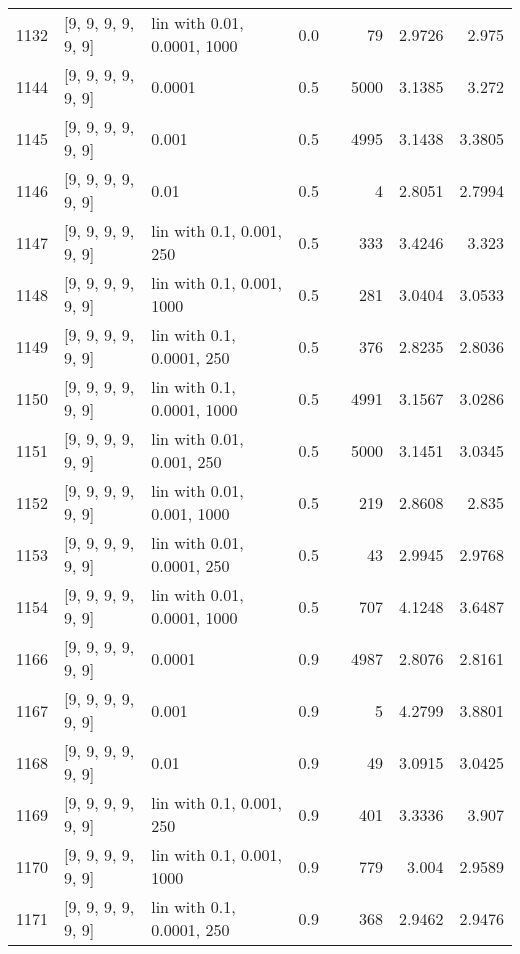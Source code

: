 \begin{longtable}{lllrrrrr}
 1132 & [9, 9, 9, 9, 9, 9] & lin with 0.01, 0.0001, 1000 &      0.0 &     &   79 &   2.9726 &    2.975 \\
 1144 & [9, 9, 9, 9, 9, 9] &                      0.0001 &      0.5 &     & 5000 &   3.1385 &    3.272 \\
 1145 & [9, 9, 9, 9, 9, 9] &                       0.001 &      0.5 &     & 4995 &   3.1438 &   3.3805 \\
 1146 & [9, 9, 9, 9, 9, 9] &                        0.01 &      0.5 &     &    4 &   2.8051 &   2.7994 \\
 1147 & [9, 9, 9, 9, 9, 9] &    lin with 0.1, 0.001, 250 &      0.5 &     &  333 &   3.4246 &    3.323 \\
 1148 & [9, 9, 9, 9, 9, 9] &   lin with 0.1, 0.001, 1000 &      0.5 &     &  281 &   3.0404 &   3.0533 \\
 1149 & [9, 9, 9, 9, 9, 9] &   lin with 0.1, 0.0001, 250 &      0.5 &     &  376 &   2.8235 &   2.8036 \\
 1150 & [9, 9, 9, 9, 9, 9] &  lin with 0.1, 0.0001, 1000 &      0.5 &     & 4991 &   3.1567 &   3.0286 \\
 1151 & [9, 9, 9, 9, 9, 9] &   lin with 0.01, 0.001, 250 &      0.5 &     & 5000 &   3.1451 &   3.0345 \\
 1152 & [9, 9, 9, 9, 9, 9] &  lin with 0.01, 0.001, 1000 &      0.5 &     &  219 &   2.8608 &    2.835 \\
 1153 & [9, 9, 9, 9, 9, 9] &  lin with 0.01, 0.0001, 250 &      0.5 &     &   43 &   2.9945 &   2.9768 \\
 1154 & [9, 9, 9, 9, 9, 9] & lin with 0.01, 0.0001, 1000 &      0.5 &     &  707 &   4.1248 &   3.6487 \\
 1166 & [9, 9, 9, 9, 9, 9] &                      0.0001 &      0.9 &     & 4987 &   2.8076 &   2.8161 \\
 1167 & [9, 9, 9, 9, 9, 9] &                       0.001 &      0.9 &     &    5 &   4.2799 &   3.8801 \\
 1168 & [9, 9, 9, 9, 9, 9] &                        0.01 &      0.9 &     &   49 &   3.0915 &   3.0425 \\
 1169 & [9, 9, 9, 9, 9, 9] &    lin with 0.1, 0.001, 250 &      0.9 &     &  401 &   3.3336 &    3.907 \\
 1170 & [9, 9, 9, 9, 9, 9] &   lin with 0.1, 0.001, 1000 &      0.9 &     &  779 &    3.004 &   2.9589 \\
 1171 & [9, 9, 9, 9, 9, 9] &   lin with 0.1, 0.0001, 250 &      0.9 &     &  368 &   2.9462 &   2.9476 \\

\end{longtable}

